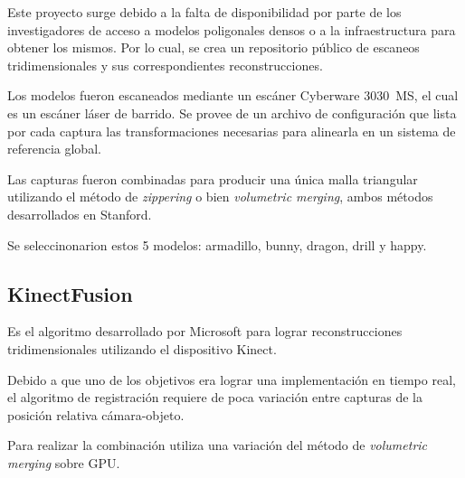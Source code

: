 			Este proyecto surge debido a la falta de disponibilidad
			por parte de los investigadores
			de acceso a modelos poligonales densos
				o a la infraestructura para obtener los mismos.
			Por lo cual, se crea un repositorio público de
			escaneos tridimensionales y sus correspondientes reconstrucciones.

			Los modelos fueron escaneados mediante un escáner Cyberware 3030~MS,
			el cual es un escáner láser de barrido.
			Se provee de un archivo de configuración que lista por cada captura
			las transformaciones necesarias para alinearla en un sistema de
			referencia global.

			Las capturas fueron combinadas para producir una única malla
			triangular utilizando el método de \emph{zippering} o bien
			\emph{volumetric merging}, ambos métodos desarrollados en Stanford.\cite{StanfordScanRep}


			Se seleccinonarion estos 5 modelos: armadillo, bunny, dragon, drill y happy.

		\subsection{KinectFusion}
			Es el algoritmo desarrollado por Microsoft para lograr reconstrucciones tridimensionales utilizando el dispositivo Kinect.

			Debido a que uno de los objetivos era lograr
			una implementación en tiempo real,
			el algoritmo de registración requiere de
			poca variación entre capturas de
			la posición relativa cámara-objeto.

			Para realizar la combinación utiliza una variación del método de
			\emph{volumetric merging} sobre GPU.\cite{Izadi:2011:KRR:2047196.2047270}



